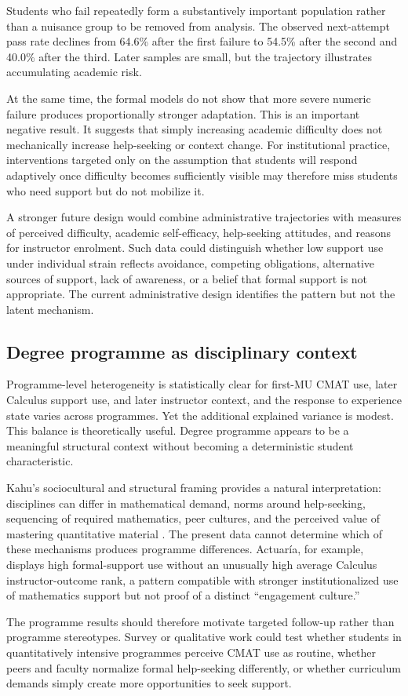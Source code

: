 Students who fail repeatedly form a substantively important population rather than a nuisance group to be removed from analysis. The observed next-attempt pass rate declines from 64.6\% after the first failure to 54.5\% after the second and 40.0\% after the third. Later samples are small, but the trajectory illustrates accumulating academic risk.

At the same time, the formal models do not show that more severe numeric failure produces proportionally stronger adaptation. This is an important negative result. It suggests that simply increasing academic difficulty does not mechanically increase help-seeking or context change. For institutional practice, interventions targeted only on the assumption that students will respond adaptively once difficulty becomes sufficiently visible may therefore miss students who need support but do not mobilize it.

A stronger future design would combine administrative trajectories with measures of perceived difficulty, academic self-efficacy, help-seeking attitudes, and reasons for instructor enrolment. Such data could distinguish whether low support use under individual strain reflects avoidance, competing obligations, alternative sources of support, lack of awareness, or a belief that formal support is not appropriate. The current administrative design identifies the pattern but not the latent mechanism.

\subsection{Degree programme as disciplinary context}

Programme-level heterogeneity is statistically clear for first-MU CMAT use, later Calculus support use, and later instructor context, and the response to experience state varies across programmes. Yet the additional explained variance is modest. This balance is theoretically useful. Degree programme appears to be a meaningful structural context without becoming a deterministic student characteristic.

Kahu's sociocultural and structural framing provides a natural interpretation: disciplines can differ in mathematical demand, norms around help-seeking, sequencing of required mathematics, peer cultures, and the perceived value of mastering quantitative material \citep{kahu2013}. The present data cannot determine which of these mechanisms produces programme differences. Actuar\'ia, for example, displays high formal-support use without an unusually high average Calculus instructor-outcome rank, a pattern compatible with stronger institutionalized use of mathematics support but not proof of a distinct ``engagement culture.''

The programme results should therefore motivate targeted follow-up rather than programme stereotypes. Survey or qualitative work could test whether students in quantitatively intensive programmes perceive CMAT use as routine, whether peers and faculty normalize formal help-seeking differently, or whether curriculum demands simply create more opportunities to seek support.

